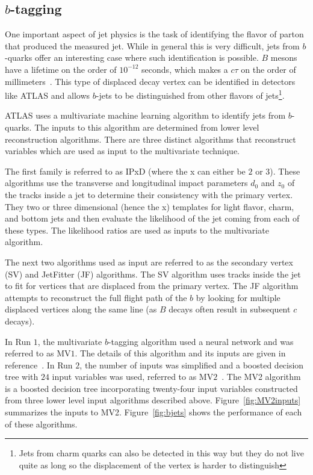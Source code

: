 \subsection{$b$-tagging}

One important aspect of jet physics is the task of identifying the flavor of parton that produced the measured jet. While in general this is very difficult, jets from $b$-quarks offer an interesting case where such identification is possible. $B$ mesons have a lifetime on the order of $10^{-12}$ seconds, which makes a $c\tau$ on the order of millimeters~\cite{PDG}. This type of displaced decay vertex can be identified in detectors like ATLAS and allows $b$-jets to be distinguished from other flavors of jets\footnote{Jets from charm quarks can also be detected in this way but they do not live quite as long so the displacement of the vertex is harder to distinguish}.

ATLAS uses a multivariate machine learning algorithm to identify jets from $b$-quarks. The inputs to this algorithm are determined from lower level reconstruction algorithms. There are three distinct algorithms that reconstruct variables which are used as input to the multivariate technique. 

The first family is referred to as IPxD (where the x can either be $2$ or $3$). These algorithms use the transverse and longitudinal impact parameters $d_0$ and $z_0$ of the tracks inside a jet to determine their consistency with the primary vertex. They two or three dimensional (hence the x) templates for light flavor, charm, and bottom jets and then evaluate the likelihood of the jet coming from each of these types. The likelihood ratios are used as inputs to the multivariate algorithm. 

The next two algorithms used as input are referred to as the secondary vertex (SV) and JetFitter (JF) algorithms. The SV algorithm uses tracks inside the jet to fit for vertices that are displaced from the primary vertex. The JF algorithm attempts to reconstruct the full flight path of the $b$ by looking for multiple displaced vertices along the same line (as $B$ decays often result in subsequent $c$ decays). 

In Run $1$, the multivariate $b$-tagging algorithm used a neural network and was referred to as MV$1$. The details of this algorithm and its inputs are given in reference~\cite{Run1BJets}. In Run $2$, the number of inputs was simplified and a boosted decision tree with $24$ input variables was used, referred to as MV$2$~\cite{Run2BJets}. The MV2 algorithm is a boosted decision tree incorporating twenty-four input variables constructed from three lower level input algorithms described above. Figure~\ref{fig:MV2inputs} summarizes the inputs to MV2. Figure~\ref{fig:bjets} shows the performance of each of these algorithms. 

